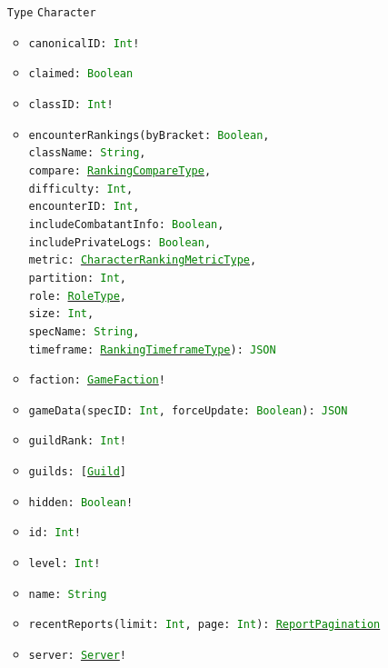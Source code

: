 \documentclass[10pt, a4paper]{memoir}
\numberwithin{equation}{section}
\theoremstyle{plain}
\theoremstyle{defp}
\theoremstyle{dotless}
\theoremstyle{definition}
\theoremstyle{dotless}
\theoremstyle{dotless}
\theoremstyle{defp}
\theoremstyle{defp}
\theoremstyle{be}          %
\theoremstyle{defp}
\newcommand\ttt[1]{\texttt{#1}}
\newcommand\type[1]{\ttt{\textcolor{green}{#1}}}
\begin{document}
\begin{itemize}[noitemsep,topsep=1pt]
	\item[\ttt{Type}] \ttt{Character}
	\begin{itemize}[itemsep=1pt,topsep=1pt]
		\item \ttt{canonicalID: \type{Int}!}
		\item \ttt{claimed: \type{Boolean}}
		\item \ttt{classID: \type{Int}!}
		\item \ttt{encounterRankings(byBracket: \type{Boolean}, \\className: \type{String}, \\compare: \hyperref[sec:RankingCompareType]{\type{RankingCompareType}}, \\difficulty: \type{Int}, \\encounterID: \type{Int}, \\includeCombatantInfo: \type{Boolean}, \\includePrivateLogs: \type{Boolean}, \\metric: \hyperref[sec:CharacterRankingMetricType]{\type{CharacterRankingMetricType}}, \\partition: \type{Int}, \\role: \hyperref[sec:RoleType]{\type{RoleType}}, \\size: \type{Int}, \\specName: \type{String}, \\timeframe: \hyperref[sec:RankingTimeframeType]{\type{RankingTimeframeType}}): \type{JSON}}
		\item \ttt{faction: \hyperref[sec:GameFaction]{\type{GameFaction}}!}
		\item \ttt{gameData(specID: \type{Int}, forceUpdate: \type{Boolean}): \type{JSON}}
		\item \ttt{guildRank: \type{Int}!}
		\item \ttt{guilds: [\hyperref[sec:Guild]{\type{Guild}}]}
		\item \ttt{hidden: \type{Boolean}!}
		\item \ttt{id: \type{Int}!}
		\item \ttt{level: \type{Int}!}
		\item \ttt{name: \type{String}}
		\item \ttt{recentReports(limit: \type{Int}, page: \type{Int}): \hyperref[sec:reportpagination]{\type{ReportPagination}}}
		\item \ttt{server: \hyperref[sec:Server]{\type{Server}}!}

\end{itemize}
\end{itemize}
\end{document}
